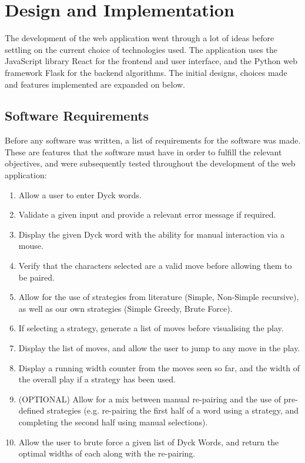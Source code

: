 \section{Design and Implementation}
The development of the web application went through a lot of ideas before settling on the current choice of technologies used. The application uses the JavaScript library React for the frontend and user interface, and the Python web framework Flask for the backend algorithms. The initial designs, choices made and features implemented are expanded on below.

\subsection{Software Requirements}
Before any software was written, a list of requirements for the software was made. These are features that the software must have in order to fulfill the relevant objectives, and were subsequently tested throughout the development of the web application:
\begin{enumerate}
    \item Allow a user to enter Dyck words.
    \item Validate a given input and provide a relevant error message if required.
    \item Display the given Dyck word with the ability for manual interaction via a mouse.
    \item Verify that the characters selected are a valid move before allowing them to be paired.
    \item Allow for the use of strategies from literature (Simple, Non-Simple recursive), as well as our own strategies (Simple Greedy, Brute Force).
    \item If selecting a strategy, generate a list of moves before visualising the play.
    \item Display the list of moves, and allow the user to jump to any move in the play.
    \item Display a running width counter from the moves seen so far, and the width of the overall play if a strategy has been used.
    \item (OPTIONAL) Allow for a mix between manual re-pairing and the use of pre-defined strategies (e.g. re-pairing the first half of a word using a strategy, and completing the second half using manual selections).
    \item Allow the user to brute force a given list of Dyck Words, and return the optimal widths of each along with the re-pairing.
\end{enumerate}

